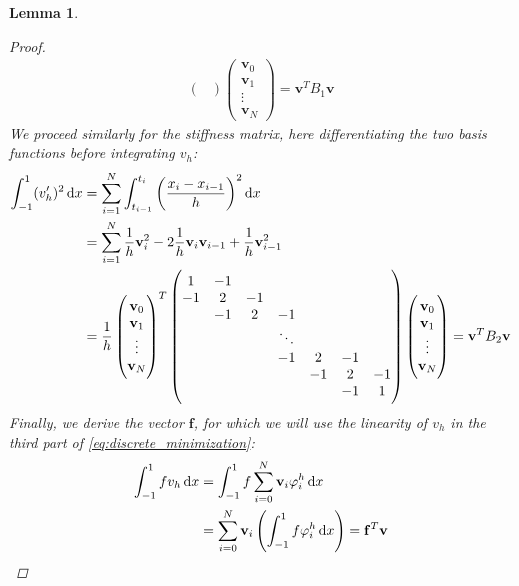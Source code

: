 \documentclass[headsepline,footsepline,footinclude=false,oneside,fontsize=11pt,paper=a4,listof=totoc,bibliography=totoc]{scrbook} %
\newtheorem{lemma}{Lemma}
\begin{document}
\begin{lemma}
\begin{proof}
\begin{align*}
\begin{pmatrix}
				\end{pmatrix}
				\begin{pmatrix}
				\mathbf{v}_0 \\					
				\mathbf{v}_1 \\
				\vdots \\
				\mathbf{v}_N 
				\end{pmatrix} = \mathbf{v}^T B_1 \mathbf{v}
			\end{align*}
			We proceed similarly for the stiffness matrix, here differentiating the two basis functions before integrating $v_h$:
			\begin{align*}
			\int_{-1}^1 (v_h')^2 \dif x &= \sum_{i=1}^{N} \int_{t_{i-1}}^{t_i} \left(\frac{x_i-x_{i-1}}{h}\right)^2 \dif x \\
			&= \sum_{i=1}^{N} \frac{1}{h} \mathbf{v}_i^2 - 2\frac{1}{h} \mathbf{v}_i\mathbf{v}_{i-1} + \frac{1}{h}\mathbf{v}_{i-1}^2 \\
			&= \frac{1}{h} 
			\begin{pmatrix}
			\mathbf{v}_0 \\					
			\mathbf{v}_1 \\
			\vdots \\
			\mathbf{v}_N 
			\end{pmatrix}^T
			\begin{pmatrix}
			1& -1 & & & & & \\
			-1& 2& -1 & & & & \\
			& -1& 2& -1 & & & \\
			& & & \ddots & & & \\
			& & & -1& 2& -1 & \\
			& & & & -1& 2& -1 \\
			& & & & & -1& 1
			\end{pmatrix}
			\begin{pmatrix}
			\mathbf{v}_0 \\					
			\mathbf{v}_1 \\
			\vdots \\
			\mathbf{v}_N 
			\end{pmatrix} = \mathbf{v}^T B_2 \mathbf{v}
			\end{align*}
			Finally, we derive the vector $\mathbf{f}$, for which we will use the linearity of $v_h$ in the third part of \eqref{eq:discrete_minimization}:
			\begin{align*}
				\int_{-1}^1 fv_h \dif x &= \int_{-1}^1 f \sum_{i=0}^{N} \mathbf{v}_i \varphi_i^h \dif x \\
				&= \sum_{i=0}^{N} \mathbf{v}_i \left(\int_{-1}^1 f\varphi_i^h\dif x\right) = \mathbf{f}^T \mathbf{v}
			\end{align*}
		\end{proof}
\end{lemma}
\end{document}
